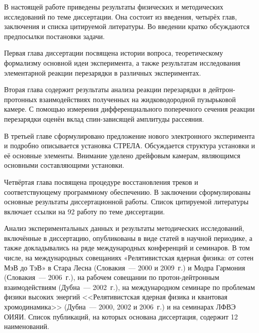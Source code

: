 В настоящей работе приведены результаты физических и методических исследований
по теме диссертации. Она состоит из введения, четырёх глав, заключения и списка
цитируемой литературы. Во введении кратко обсуждаются предпосылки постановки
задачи.

Первая глава диссертации посвящена истории вопроса, теоретическому формализму
основной идеи эксперимента, а также результатам исследования элементарной
реакции \np перезарядки в различных экспериментах.

Вторая глава содержит результаты анализа реакции перезарядки в дейтрон-протонных
взаимодействиях полученных на жидководородной пузырьковой камере. С помощью
измерения дифференциального поперечного сечения реакции перезарядки \dpchex
оценён вклад спин-зависящей амплитуды \np рассеяния.

В третьей главе сформулировано предложение нового электронного эксперимента и
подробно описывается установка СТРЕЛА. Обсуждается структура установки и её
основные элементы. Внимание уделено дрейфовым камерам, являющимся основными
составляющими установки.

Четвёртая глава посвящена процедуре восстановления треков и соответствующему
программному обеспечению. В заключении сформулированы основные результаты
диссертационной работы. Список цитируемой литературы включает ссылки на
92 работу по теме диссертации.

Анализ экспериментальных данных и результаты методических исследований,
включённые в диссертацию, опубликованы в виде статей в научной периодике, а
также докладывались на ряде международных конференций и семинаров. В том числе,
на международных совещаниях «Релятивистская ядерная физика: от сотен МэВ до ТэВ»
в Стара Лесна (Словакия~--- 2000 и 2009~г.) и Модра Гармония (Словакия~---
2006~г.), на рабочем совещании по протон-дейтронным взаимодействиям (Дубна~---
2002~г.), на международном семинаре по проблемам физики высоких энергий
<<Релятивистская ядерная физика и квантовая хромодинамика>> (Дубна~--- 2000,
2002 и 2006~г.) и на семинарах ЛФВЭ ОИЯИ. Список публикаций, на которых основана
диссертация, содержит 12 наименований.

